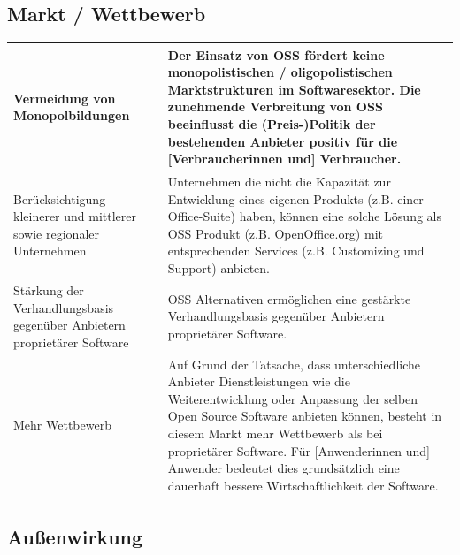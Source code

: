 \documentclass[a4paper]{scrartcl}
\begin{document}
\subsection{Markt / Wettbewerb}

\begin{supertabular}{|m{1.8900598in}m{4.77126in}|}
\hline

Vermeidung von Monopolbildungen &

Der Einsatz von OSS fördert keine monopolistischen / oligopolistischen
Marktstrukturen im Softwaresektor. Die zunehmende Verbreitung von OSS
beeinflusst die (Preis-)Politik der bestehenden Anbieter positiv für die
[Verbraucherinnen und] Verbraucher.\\

\hline

Berücksichtigung kleinerer und mittlerer sowie regionaler Unternehmen &

Unternehmen die nicht die Kapazität zur Entwicklung eines eigenen Produkts
(z.B. einer Office-Suite) haben, können eine solche Lösung als OSS Produkt
(z.B. OpenOffice.org) mit entsprechenden Services (z.B. Customizing und
Support) anbieten.\\

\hline

Stärkung der Verhandlungsbasis gegenüber Anbietern proprietärer Software &

OSS Alternativen ermöglichen eine gestärkte Verhandlungsbasis gegenüber
Anbietern proprietärer Software.\\

\hline

Mehr Wettbewerb &

Auf Grund der Tatsache, dass unterschiedliche Anbieter Dienstleistungen wie die
Weiterentwicklung oder Anpassung der selben Open Source Software anbieten
können, besteht in diesem Markt mehr Wettbewerb als bei proprietärer
Software. Für [Anwenderinnen und] Anwender bedeutet dies grundsätzlich eine
dauerhaft bessere Wirtschaftlichkeit der Software.\\

\hline
\end{supertabular}

\subsection{Außenwirkung}
\end{document}
